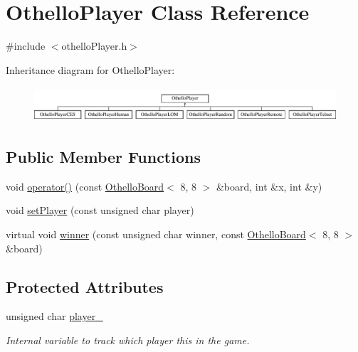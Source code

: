 \hypertarget{classOthelloPlayer}{\section{Othello\-Player Class Reference}
\label{classOthelloPlayer}
}


{\ttfamily \#include $<$othello\-Player.\-h$>$}

Inheritance diagram for Othello\-Player\-:\begin{figure}[H]
\begin{center}
\leavevmode
\includegraphics[height=1.314554cm]{classOthelloPlayer}
\end{center}
\end{figure}
\subsection*{Public Member Functions}
\begin{DoxyCompactItemize}
\item 
void \hyperlink{classOthelloPlayer_a9aa0f48e9cb6c1e7c9037850423f2915}{operator()} (const \hyperlink{classOthelloBoard}{Othello\-Board}$<$ 8, 8 $>$ \&board, int \&x, int \&y)
\item 
void \hyperlink{classOthelloPlayer_a856fb93347be5480c9db179bb912c694}{set\-Player} (const unsigned char player)
\item 
virtual void \hyperlink{classOthelloPlayer_a278b0f93b676c302f914a3dac85d5adf}{winner} (const unsigned char winner, const \hyperlink{classOthelloBoard}{Othello\-Board}$<$ 8, 8 $>$ \&board)
\end{DoxyCompactItemize}
\subsection*{Protected Attributes}
\begin{DoxyCompactItemize}
\item 
\hypertarget{classOthelloPlayer_a19f59ab327765eac668851590e7d51f3}{unsigned char \hyperlink{classOthelloPlayer_a19f59ab327765eac668851590e7d51f3}{player\-\_\-}}\label{classOthelloPlayer_a19f59ab327765eac668851590e7d51f3}

\begin{DoxyCompactList}\small\item\em Internal variable to track which player this in the game. \end{DoxyCompactList}\end{DoxyCompactItemize}


